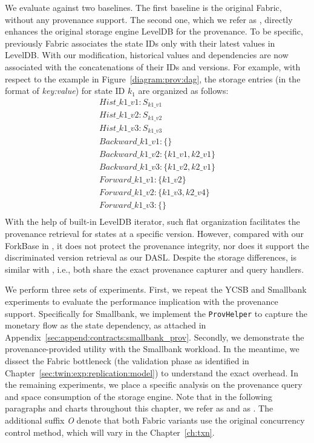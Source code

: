 We evaluate {\fs} against two baselines. 
The first baseline is the original Fabric, without any provenance support.
The second one, which we refer as {\fsPr}, directly enhances the original storage engine LevelDB for the provenance. 
To be specific, previously Fabric associates the state IDs only with their latest values in LevelDB. 
With our modification, historical values and dependencies are now associated with the concatenations of their IDs and versions. 
For example, with respect to the example in Figure~\ref{diagram:prov:dag}, the storage entries (in the format of \textit{key:value}) for state ID $k_1$ are organized as follows: 
\begin{equation*}
  \begin{aligned}
    Hist\_k1\_v1: S_{k1\_v1} \\
    Hist\_k1\_v2: S_{k1\_v2} \\
    Hist\_k1\_v3: S_{k1\_v3} \\
    Backward\_k1\_v1: \{\} \\
    Backward\_k1\_v2: \{k1\_v1,k2\_v1\} \\
    Backward\_k1\_v3: \{k1\_v2,k2\_v1\} \\
    Forward\_k1\_v1: \{k1\_v2\} \\
    Forward\_k1\_v2: \{k1\_v3, k2\_v4\} \\
    Forward\_k1\_v3: \{\} \\
  \end{aligned}
\end{equation*}
With the help of built-in LevelDB iterator, such flat organization facilitates the provenance retrieval for states at a specific version. 
However, compared with our ForkBase in {\fs}, it does not protect the provenance integrity, nor does it support the discriminated version retrieval as our DASL. 
Despite the storage differences, {\fsPr} is similar with {\fs}, i.e., both share the exact provenance capturer and query handlers. 

We perform three sets of experiments. First, we repeat the YCSB and Smallbank experiments to evaluate the performance implication with the provenance support. 
Specifically for Smallbank, we implement the \texttt{ProvHelper} to capture the monetary flow as the state dependency, as attached in Appendix~\ref{sec:append:contracts:smallbank_prov}.
Secondly, we demonstrate the provenance-provided utility with the Smallbank workload. 
In the meantime, we dissect the Fabric bottleneck (the validation phase as identified in Chapter~\ref{sec:twin:exp:replication:model}) to understand the exact overhead. 
In the remaining experiments, we place a specific analysis on the provenance query and space consumption of the storage engine. 
Note that in the following paragraphs and charts throughout this chapter, we refer {\fsPr} as {\fsPrO} and {\fs} as {\fsO}. The additional suffix \textit{O} denote that both Fabric variants use the original concurrency control method,
which will vary in the Chapter~\ref{ch:txn}. 

